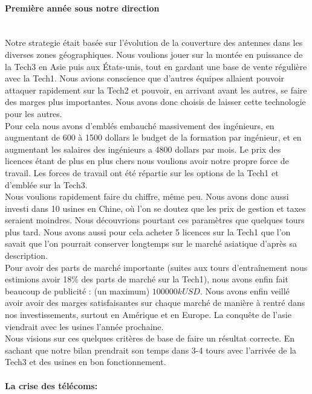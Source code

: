 \paragraph{Première année sous notre direction}~\\
Notre strategie était basée sur l'évolution de la couverture des
antennes dans les diverses zones géographiques. Nous voulions jouer
sur la montée en puissance de la Tech3 en Asie puis aux États-unis,
tout en gardant une base de vente régulière avec la Tech1. Nous
avions conscience que d'autres équipes allaient pouvoir attaquer 
rapidement sur la Tech2 et pouvoir, en arrivant avant les autres,
se faire des marges plus importantes. Nous avons donc choisis de 
laisser cette technologie pour les autres.\\

Pour cela nous avons d'emblés embauché massivement des ingénieurs, 
en augmentant de 600 à 1500 dollars le budget de la formation par 
ingénieur, et en augmentant les salaires des ingénieurs a 4800
dollars par mois. Le prix des licences étant de plus en plus chers
nous voulions avoir notre propre force de travail.
Les forces de travail ont été répartie sur les options de la Tech1
et d'emblée sur la Tech3.\\

Nous voulions rapidement faire du chiffre, même peu. Nous avons donc 
aussi investi dans 10 usines en Chine, où l'on se doutez que les prix 
de gestion et taxes seraient moindres. Nous découvrions pourtant
ces paramètres que quelques tours plus tard. Nous avons aussi pour cela
acheter 5 licences sur la Tech1 que l'on savait que l'on pourrait 
conserver longtemps sur le marché asiatique d'après sa description.\\
 
Pour avoir des parts de marché importante (suites aux tours d'entraînement
nous estimions avoir 18\% des parts de marché sur la Tech1), nous
avons enfin fait beaucoup de publicité : (un maximum) $100 000 kUSD$.
Nous avons enfin veillé avoir avoir des marges satisfaisantes sur chaque
marché de manière à rentré dans nos investissements, surtout en Amérique
et en Europe. La conquête de l'asie viendrait avec les usines l'année 
prochaine.\\

Nous visions sur ces quelques critères de base de faire un résultat
correcte. En sachant que notre bilan prendrait son temps dans 3-4 tours
avec l'arrivée de la Tech3 et des usines en bon fonctionnement.


\paragraph{La crise des télécoms:}~\\

